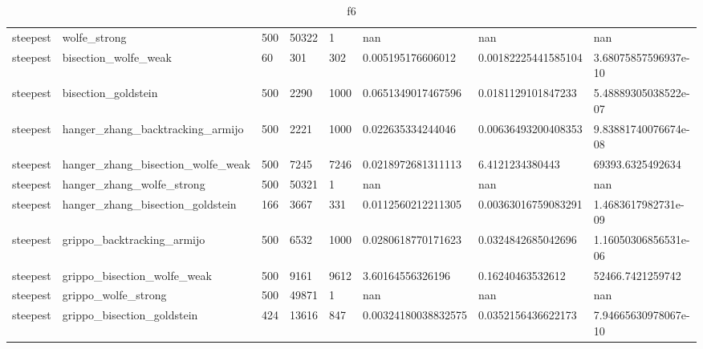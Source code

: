 \documentclass[a4paper,11pt]{article}
\numberwithin{equation}{section} %
\begin{document}
\begin{table}[h!]
{\begin{tabular}{|l|l|l|l|l|l|l|l|}
        steepest & wolfe\_strong & 500 & 50322 & 1 & nan & nan & nan \\
        steepest & bisection\_wolfe\_weak & 60 & 301 & 302 & 0.005195176606012 & 0.00182225441585104 & 3.68075857596937e-10 \\
        steepest & bisection\_goldstein & 500 & 2290 & 1000 & 0.0651349017467596 & 0.0181129101847233 & 5.48889305038522e-07 \\
        steepest & hanger\_zhang\_backtracking\_armijo & 500 & 2221 & 1000 & 0.022635334244046 & 0.00636493200408353 & 9.83881740076674e-08 \\
        steepest & hanger\_zhang\_bisection\_wolfe\_weak & 500 & 7245 & 7246 & 0.0218972681311113 & 6.4121234380443 & 69393.6325492634 \\
        steepest & hanger\_zhang\_wolfe\_strong & 500 & 50321 & 1 & nan & nan & nan \\
        steepest & hanger\_zhang\_bisection\_goldstein & 166 & 3667 & 331 & 0.0112560212211305 & 0.00363016759083291 & 1.4683617982731e-09 \\
        steepest & grippo\_backtracking\_armijo & 500 & 6532 & 1000 & 0.0280618770171623 & 0.0324842685042696 & 1.16050306856531e-06 \\
        steepest & grippo\_bisection\_wolfe\_weak & 500 & 9161 & 9612 & 3.60164556326196 & 0.16240463532612 & 52466.7421259742 \\
        steepest & grippo\_wolfe\_strong & 500 & 49871 & 1 & nan & nan & nan \\
        steepest & grippo\_bisection\_goldstein & 424 & 13616 & 847 & 0.00324180038832575 & 0.0352156436622173 & 7.94665630978067e-10 \\

\end{tabular}}
\caption{f6}
\label{table:f6}
\end{table}
\end{document}
